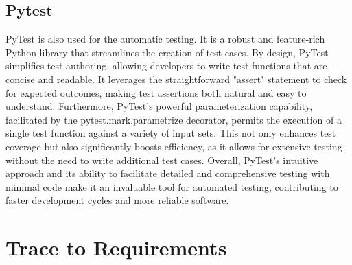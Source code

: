 \documentclass[12pt, titlepage]{article}
\begin{document}
\subsection{Pytest}
PyTest is also used for the automatic testing. It is a robust and feature-rich Python library that streamlines the creation of test cases. 
By design, PyTest simplifies test authoring, allowing developers to write test functions that are concise and readable. 
It leverages the straightforward "assert" statement to check for expected outcomes, making test assertions both natural and easy to understand. 
Furthermore, PyTest's powerful parameterization capability, facilitated by the pytest.mark.parametrize decorator, permits the execution of a single test function against a variety of input sets. 
This not only enhances test coverage but also significantly boosts efficiency, as it allows for extensive testing without the need to write additional test cases.
 Overall, PyTest's intuitive approach and its ability to facilitate detailed and comprehensive testing with minimal code make it an invaluable tool for automated testing, contributing to faster development cycles and more reliable software.

\section{Trace to Requirements}
\end{document}
